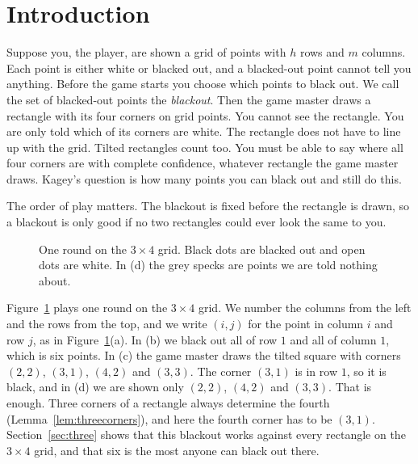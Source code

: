 \section{Introduction}\label{sec:intro}

Suppose you, the player, are shown a grid of points with $h$ rows and $m$ columns. Each
point is either white or blacked out, and a blacked-out point cannot tell you anything.
Before the game starts you choose which points to black out. We call the set of
blacked-out points the \emph{blackout}. Then the game master draws a rectangle with its
four corners on grid points. You cannot see the rectangle. You are only told which of
its corners are white. The rectangle does not have to line up with the grid. Tilted
rectangles count too. You must be able to say where all four corners are with complete
confidence, whatever rectangle the game master draws. Kagey's question is how many
points you can black out and still do this.

The order of play matters. The blackout is fixed before the rectangle is drawn, so a
blackout is only good if no two rectangles could ever look the same to you.

\begin{figure}[t]
\centering
\resizebox{0.95\textwidth}{!}{}
\caption{One round on the $3\times4$ grid. Black dots are blacked out and open dots are
white. In (d) the grey specks are points we are told nothing about.}
\label{fig:game}
\end{figure}

Figure~\ref{fig:game} plays one round on the $3\times4$ grid. We number the columns
from the left and the rows from the top, and we write $(i,j)$ for the point in column
$i$ and row $j$, as in Figure~\ref{fig:game}(a). In (b) we black out all of row $1$
and all of column $1$, which is six points. In (c) the game master draws the tilted
square with corners $(2,2)$, $(3,1)$, $(4,2)$ and $(3,3)$. The corner $(3,1)$ is in row
$1$, so it is black, and in (d) we are shown only $(2,2)$, $(4,2)$ and $(3,3)$. That is
enough. Three corners of a rectangle always determine the fourth
(Lemma~\ref{lem:threecorners}), and here the fourth corner has to be $(3,1)$.
Section~\ref{sec:three} shows that this blackout works against every rectangle on the
$3\times4$ grid, and that six is the most anyone can black out there.

